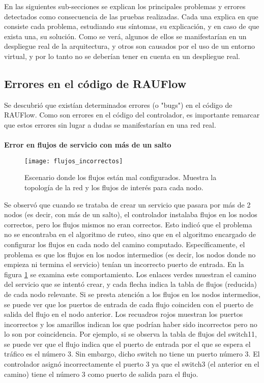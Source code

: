 En las siguientes sub-secciones se explican los principales problemas y errores detectados como consecuencia de las pruebas realizadas. Cada una explica en que consiste cada problema, estudiando sus síntomas, su explicación, y en caso de que exista una, su solución. Como se verá, algunos de ellos se manifestarían en un despliegue real de la arquitectura, y otros son causados por el uso de un entorno virtual, y por lo tanto no se deberían tener en cuenta en un despliegue real.

\subsection{Errores en el código de RAUFlow}
Se descubrió que existían determinados errores (o "bugs") en el código de RAUFlow. Como son errores en el código del controlador, es importante remarcar que estos errores sin lugar a dudas se manifestarían en una red real. \\ \\
\textbf{Error en flujos de servicio con más de un salto} \\
\begin{figure}[t]
	\caption{Escenario donde los flujos están mal configurados. Muestra la topología de la red y los flujos de interés para cada nodo.}
	\texttt{[image: flujos\_incorrectos]}
	\centering
	\label{fig:flujos_incorrectos}
\end{figure}
Se observó que cuando se trataba de crear un servicio que pasara por más de 2 nodos (es decir, con más de un salto), el controlador instalaba flujos en los nodos correctos, pero los flujos mismos no eran correctos. Esto indicó que el problema no se encontraba en el algoritmo de ruteo, sino que en el algoritmo encargado de configurar los flujos en cada nodo del camino computado. Específicamente, el problema es que los flujos en los nodos intermedios (es decir, los nodos donde no empieza ni termina el servicio) tenían un incorrecto puerto de entrada. En la figura \ref{fig:flujos_incorrectos} se examina este comportamiento. Los enlaces verdes muestran el camino del servicio que se intentó crear, y cada flecha indica la tabla de flujos (reducida) de cada nodo relevante. Si se presta atención a los flujos en los nodos intermedios, se puede ver que los puertos de entrada de cada flujo coinciden con el puerto de salida del flujo en el nodo anterior. Los recuadros rojos muestran los puertos incorrectos y los amarillos indican los que podrían haber sido incorrectos pero no lo son por coincidencia. Por ejemplo, si se observa la tabla de flujos del switch11, se puede ver que el flujo indica que el puerto de entrada por el que se espera el tráfico es el número 3. Sin embargo, dicho switch no tiene un puerto número 3. El controlador asignó incorrectamente el puerto 3 ya que el switch3 (el anterior en el camino) tiene el número 3 como puerto de salida para el flujo.

